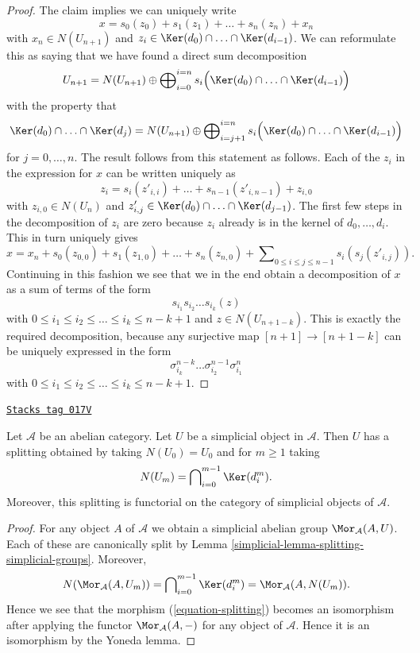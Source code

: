 \begin{proof}
\medskip\noindent
The claim implies we can uniquely write
$$
x = s_0(z_0) + s_1(z_1) + \ldots + s_n(z_n) + x_n
$$
with $x_n \in N(U_{n + 1})$ and
$z_i \in \Ker(d_0) \cap \ldots \cap \Ker(d_{i - 1})$.
We can reformulate this as saying that we have found a direct
sum decomposition
$$
U_{n + 1}
=
N(U_{n + 1})
\oplus
\bigoplus\nolimits_{i = 0}^{i = n}
s_i\Big(\Ker(d_0) \cap \ldots \cap \Ker(d_{i - 1})\Big)
$$
with the property that
$$
\Ker(d_0) \cap \ldots \cap \Ker(d_j)
=
N(U_{n + 1}) \oplus
\bigoplus\nolimits_{i = j + 1}^{i = n}
s_i\Big(\Ker(d_0) \cap \ldots \cap \Ker(d_{i - 1})\Big)
$$
for $j = 0, \ldots, n$.
The result follows from this statement as follows.
Each of the $z_i$ in the expression for $x$
can be written uniquely as
$$
z_i = s_i(z'_{i, i}) + \ldots + s_{n - 1}(z'_{i, n - 1}) + z_{i, 0}
$$
with $z_{i, 0} \in N(U_n)$ and
$z'_{i, j} \in \Ker(d_0) \cap \ldots \cap \Ker(d_{j - 1})$.
The first few steps in the decomposition of $z_i$ are zero because
$z_i$ already is in the kernel of $d_0, \ldots, d_i$.
This in turn uniquely gives
$$
x = x_n + s_0(z_{0, 0}) + s_1(z_{1, 0}) + \ldots + s_n(z_{n, 0}) +
\sum\nolimits_{0 \leq i \leq j \leq n - 1} s_i(s_j(z'_{i, j})).
$$
Continuing in this fashion we see that we in the end obtain
a decomposition of $x$ as a sum of terms
of the form
$$
s_{i_1} s_{i_2} \ldots s_{i_k} (z)
$$
with $0 \leq i_1 \leq i_2 \leq \ldots \leq i_k \leq n - k + 1$ and
$z \in N(U_{n + 1 - k})$. This is exactly the required
decomposition, because any surjective map $[n + 1] \to [n + 1 - k]$
can be uniquely expressed in the form
$$
\sigma^{n - k}_{i_k} \ldots \sigma^{n - 1}_{i_2} \sigma^n_{i_1}
$$
with $0 \leq i_1 \leq i_2 \leq \ldots \leq i_k \leq n - k + 1$.
\end{proof}

\begin{lemma}
\label{simplicial-lemma-splitting-abelian-category}
\href{https://stacks.math.columbia.edu/tag/017V}{\texttt{Stacks tag 017V}}

Let $\mathcal{A}$ be an abelian category.
Let $U$ be a simplicial object in $\mathcal{A}$.
Then $U$ has a splitting obtained by taking $N(U_0) = U_0$ and
for $m \geq 1$ taking
$$
N(U_m) = \bigcap\nolimits_{i = 0}^{m - 1} \Ker(d^m_i).
$$
Moreover, this splitting is functorial on the category of
simplicial objects of $\mathcal{A}$.
\end{lemma}

\begin{proof}

For any object $A$ of $\mathcal{A}$ we obtain
a simplicial abelian group $\Mor_\mathcal{A}(A, U)$.
Each of these are canonically split by Lemma
\ref{simplicial-lemma-splitting-simplicial-groups}. Moreover,
$$
N(\Mor_\mathcal{A}(A, U_m)) =
\bigcap\nolimits_{i = 0}^{m - 1} \Ker(d^m_i) =
\Mor_\mathcal{A}(A, N(U_m)).
$$
Hence we see that the morphism (\ref{equation-splitting})
becomes an isomorphism after applying the functor
$\Mor_\mathcal{A}(A, -)$ for any object of $\mathcal{A}$.
Hence it is an isomorphism by the Yoneda lemma.
\end{proof}

